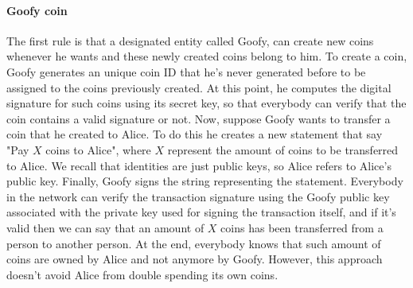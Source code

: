 \paragraph{Goofy coin} The first rule is that a designated entity called Goofy, can create new coins whenever he wants and these newly created coins belong to him. To create a coin, Goofy generates an unique coin ID that he's never generated before to be assigned to the coins previously created. At this point, he computes the digital signature for such coins using its secret key, so that everybody can verify that the coin contains a valid signature or not. Now, suppose Goofy wants to transfer a coin that he created to Alice. To do this he creates a new statement that say "Pay $X$ coins to Alice", where $X$ represent the amount of coins to be transferred to Alice. We recall that identities are just public keys, so Alice refers to Alice's public key. Finally, Goofy signs the string representing the statement. Everybody in the network can verify the transaction signature using the Goofy public key associated with the private key used for signing the transaction itself, and if it's valid then we can say that an amount of $X$ coins has been transferred from a person to another person. At the end, everybody knows that such amount of coins are owned by Alice and not anymore by Goofy. However, this approach doesn't avoid Alice from double spending its own coins.

